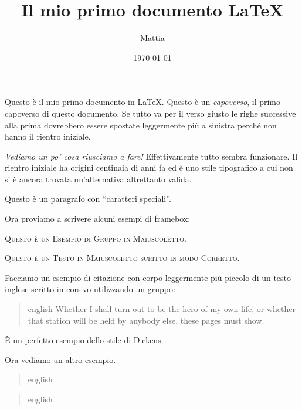 \documentclass[a4paper, 12pt]{article}
\newenvironment{citazione}[1]
{\begin{quotation}\begin{otherlanguage*}{#1}\small\itshape}
{\end{otherlanguage*}\end{quotation}}
\newenvironment{incipit}[1]
{\begin{citazione}{#1}\normalfont}
{\end{citazione}}
\begin{document}
\title{Il mio primo documento LaTeX}
\author{Mattia}
\date{\today}
\maketitle

Questo è il mio primo documento in \LaTeX{}.
Questo è un \textit{capoverso}, il primo capoverso di questo documento.
Se tutto va per il verso giusto le righe successive alla prima dovrebbero essere spostate leggermente più a sinistra perché non hanno il rientro iniziale.

\emph{Vediamo un po' cosa riusciamo a fare!}
Effettivamente tutto sembra funzionare.
Il rientro iniziale ha origini centinaia di anni fa ed è uno stile tipografico a cui non si è ancora trovata un'alternativa altrettanto valida.

\small Questo \`{e} un paragrafo con ``caratteri speciali''.

Ora proviamo a scrivere alcuni esempi di framebox:




{\scshape Questo è un Esempio di Gruppo in Maiuscoletto.}

\textsc{Questo è un Testo in Maiuscoletto scritto in modo Corretto.}

Facciamo un esempio di citazione con corpo leggermente più piccolo di un testo inglese scritto in corsivo utilizzando un gruppo:
\begin{quotation}
    \small\itshape 
    \begin{otherlanguage*}{english}
        Whether I shall turn out to be the hero
        of my own life, or whether that station will be
        held by anybody else, these pages must show.
    \end{otherlanguage*}
\end{quotation}
\`{E} un perfetto esempio dello stile di Dickens.

Ora vediamo un altro esempio.

\kant[1][1-4]

\begin{incipit}{english}
    \kant[2][1-4]
\end{incipit}

\kant[3][1-4]

\begin{citazione}{english}
    \kant[4][1-2]
\end{citazione}
\end{document}

